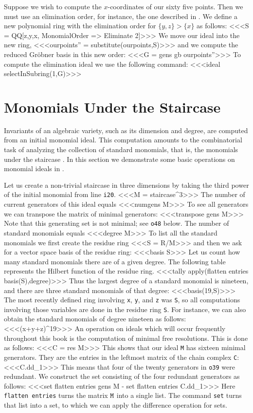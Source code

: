 \medskip

Suppose we wish to compute the $x$-coordinates of our sixty five points.
Then we must use an elimination order, for instance, the
one described in \cite[\S 3.2, Exercise 6.a]{CLO1}.
We define a  new polynomial ring with the elimination order
for $\{y,z\} > \{x\}$ as follows:
<<<S = QQ[z,y,x, MonomialOrder => Eliminate 2]>>>
We move our ideal into the new ring,
<<<ourpoints'' = substitute(ourpoints,S)>>>
and we compute the reduced Gr\"obner basis in this new order:
<<<G = gens gb ourpoints''>>>
To compute the elimination ideal we use the following command:
<<<ideal selectInSubring(1,G)>>>

\section{Monomials Under the Staircase}

Invariants of an algebraic variety, such as its dimension
and degree, are computed from an initial monomial ideal.
This computation amounts to the combinatorial task
of analyzing the collection of standard monomials,
that is, the monomials under the staircase \cite[Chapter 9]{CLO1}.
In this section we demonstrate some basic operations on
monomial ideals in \Mtwo.

Let us create a non-trivial staircase in three dimensions
by taking the third power of the initial monomial from line {\tt i20}.
<<<M = staircase^3>>>
The number of current generators of this ideal equals
<<<numgens M>>>
To see all generators we can transpose the matrix of minimal generators:
<<<transpose gens M>>>
Note that this generating set is not minimal; see {\tt o48} below.
The number of standard monomials equals
<<<degree M>>>
To list all the standard monomials we first create the residue ring
<<<S = R/M>>>
and then we ask for a vector space basis of the residue ring:
<<<basis S>>>
Let us count how many standard monomials there are of a given degree.
The following table represents the Hilbert function
of the residue ring.
<<<tally apply(flatten entries basis(S),degree)>>>
Thus the largest degree of a standard monomial is nineteen,
and there are three standard monomials of that degree:
<<<basis(19,S)>>>
The most recently defined ring involving {\tt x}, {\tt y}, and {\tt z} was
{\tt S}, so all computations involving those variables are done in the
residue ring {\tt S}.
For instance, we can also obtain the
standard monomials of  degree nineteen as follows:
<<<(x+y+z)^19>>>
An operation on ideals which will occur frequently throughout this
book is the computation of minimal free resolutions. This is done as follows:
<<<C = res M>>>
This shows that our ideal {\tt M} has sixteen minimal generators.
They are the entries in the leftmost matrix of the chain complex {\tt C}:
<<<C.dd_1>>>
This means that four of the twenty generators in {\tt o39} were redundant.
We construct the set consisting of the four redundant generators
as follows:
<<<set flatten entries gens M - set flatten entries C.dd_1>>>
Here {\tt flatten entries} turns the matrix ${\tt M}$ into a single list.
The command {\tt set} turns that list into a set, to which we
can apply the difference operation for sets.

